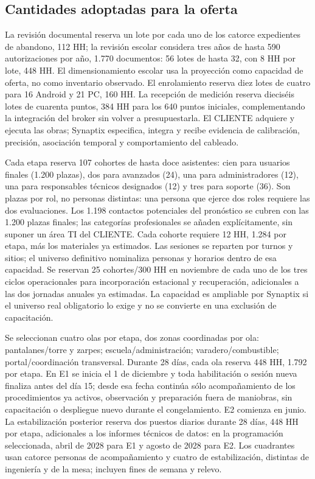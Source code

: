\subsection{Cantidades adoptadas para la oferta}
La revisión documental reserva un lote por cada uno de los catorce expedientes de abandono, 112 HH; la revisión escolar considera tres años de hasta 590 autorizaciones por año, 1.770 documentos: 56 lotes de hasta 32, con 8 HH por lote, 448 HH. El dimensionamiento escolar usa la proyección como capacidad de oferta, no como inventario observado. El enrolamiento reserva diez lotes de cuatro para 16 Android y 21 PC, 160 HH. La recepción de medición reserva dieciséis lotes de cuarenta puntos, 384 HH para los 640 puntos iniciales, complementando la integración del broker sin volver a presupuestarla. El CLIENTE adquiere y ejecuta las obras; Synaptix especifica, integra y recibe evidencia de calibración, precisión, asociación temporal y comportamiento del cableado.

Cada etapa reserva 107 cohortes de hasta doce asistentes: cien para usuarios finales (1.200 plazas), dos para avanzados (24), una para administradores (12), una para responsables técnicos designados (12) y tres para soporte (36). Son plazas por rol, no personas distintas: una persona que ejerce dos roles requiere las dos evaluaciones. Los 1.198 contactos potenciales del pronóstico se cubren con las 1.200 plazas finales; las categorías profesionales se añaden explícitamente, sin suponer un área TI del CLIENTE. Cada cohorte requiere 12 HH, 1.284 por etapa, más los materiales ya estimados. Las sesiones se reparten por turnos y sitios; el universo definitivo nominaliza personas y horarios dentro de esa capacidad. Se reservan 25 cohortes/300 HH en noviembre de cada uno de los tres ciclos operacionales para incorporación estacional y recuperación, adicionales a las dos jornadas anuales ya estimadas. La capacidad es ampliable por Synaptix si el universo real obligatorio lo exige y no se convierte en una exclusión de capacitación.

Se seleccionan cuatro olas por etapa, dos zonas coordinadas por ola: pantalanes/torre y zarpes; escuela/administración; varadero/combustible; portal/coordinación transversal. Durante 28 días, cada ola reserva 448 HH, 1.792 por etapa. En E1 se inicia el 1 de diciembre y toda habilitación o sesión nueva finaliza antes del día 15; desde esa fecha continúa sólo acompañamiento de los procedimientos ya activos, observación y preparación fuera de maniobras, sin capacitación o despliegue nuevo durante el congelamiento. E2 comienza en junio. La estabilización posterior reserva dos puestos diarios durante 28 días, 448 HH por etapa, adicionales a los informes técnicos de datos: en la programación seleccionada, abril de 2028 para E1 y agosto de 2028 para E2. Los cuadrantes usan catorce personas de acompañamiento y cuatro de estabilización, distintas de ingeniería y de la mesa; incluyen fines de semana y relevo.

